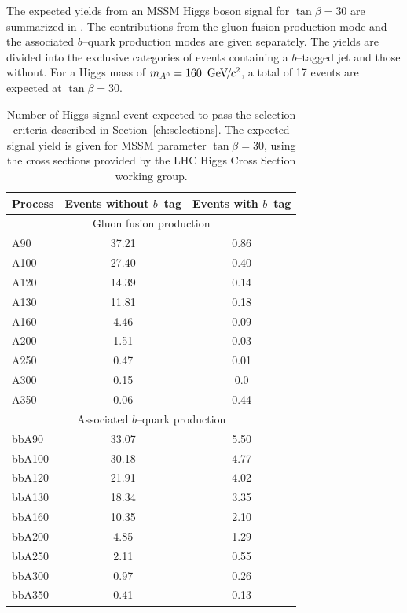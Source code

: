 The expected yields from an MSSM Higgs boson signal for \mbox{$\tan\beta = 30$}
are summarized in \label{tab:SignalExpResultsLooseAHtoMuTau}.  The contributions
from the gluon fusion production mode and the associated $b$--quark production
modes are given separately.  The yields are divided into the exclusive
categories of events containing a $b$--tagged jet and those without.  For a
Higgs mass of $m_{A^0} = 160~{\,\text{Ge\hspace{-.08em}V\hspace{-0.16em}/\hspace{-0.08em}}c^\text{2}}$, a total of 17 events are expected at
$\tan\beta = 30$.
%
\begin{table}[t]
\begin{center}
\tablesize
\begin{tabular}{|l|c|c|}
\hline
Process & Events without $b$--tag & Events with $b$--tag \\
\hline
\hline
\multicolumn{3}{|c|}{Gluon fusion production} \\
\hline
A90 & 37.21 & 0.86 \\
A100 & 27.40 & 0.40 \\
A120 & 14.39 & 0.14 \\
A130 & 11.81 & 0.18 \\
A160 & 4.46 & 0.09 \\
A200 & 1.51 & 0.03 \\
A250 & 0.47 & 0.01 \\
A300 & 0.15 & 0.0 \\
A350 & 0.06 & 0.44 \\
\hline
\multicolumn{3}{|c|}{Associated $b$--quark production} \\
\hline
bbA90 & 33.07 &  5.50 \\
bbA100 & 30.18 &  4.77 \\
bbA120 & 21.91 & 4.02 \\
bbA130 & 18.34 & 3.35 \\ 
bbA160 & 10.35 &  2.10 \\
bbA200 & 4.85  &  1.29 \\
bbA250 & 2.11 &  0.55 \\
bbA300 & 0.97 &  0.26 \\
bbA350 & 0.41 & 0.13 \\
\hline
\end{tabular}
\caption[Expected signal yields at \mbox{$\tan \beta = 30$}]{Number of Higgs
signal event expected to pass the selection criteria described in
Section~\ref{ch:selections}.  The expected signal yield is given for MSSM
parameter \mbox{$\tan \beta = 30$}, using the cross sections provided by the LHC
Higgs Cross Section working group.} \label{tab:SignalExpResultsLooseAHtoMuTau}
\end{center}
\end{table}

